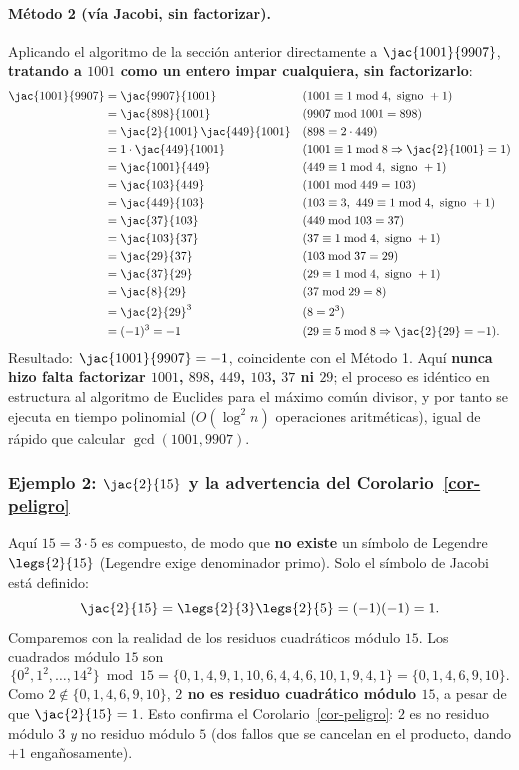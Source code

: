 \paragraph{Método 2 (vía Jacobi, sin factorizar).}
Aplicando el algoritmo de la sección anterior directamente a $\jac{1001}{9907}$, \textbf{tratando a $1001$ como un entero impar cualquiera, sin factorizarlo}:
\begin{align*}
\jac{1001}{9907} &= \jac{9907}{1001} & &(1001\equiv1\bmod4,\text{ signo }+1)\\
&= \jac{898}{1001} & &(9907 \bmod 1001 = 898)\\
&= \jac{2}{1001}\,\jac{449}{1001} & &(898=2\cdot449)\\
&= 1\cdot\jac{449}{1001} & &(1001\equiv1\bmod8 \Rightarrow \jac{2}{1001}=1)\\
&= \jac{1001}{449} & &(449\equiv1\bmod4,\text{ signo }+1)\\
&= \jac{103}{449} & &(1001 \bmod 449 = 103)\\
&= \jac{449}{103} & &(103\equiv3,\ 449\equiv1\bmod4,\text{ signo }+1)\\
&= \jac{37}{103} & &(449 \bmod 103 = 37)\\
&= \jac{103}{37} & &(37\equiv1\bmod4,\text{ signo }+1)\\
&= \jac{29}{37} & &(103 \bmod 37 = 29)\\
&= \jac{37}{29} & &(29\equiv1\bmod4,\text{ signo }+1)\\
&= \jac{8}{29} & &(37 \bmod 29 = 8)\\
&= \jac{2}{29}^3 & &(8=2^3)\\
&= (-1)^3=-1 & &(29\equiv5\bmod8 \Rightarrow \jac{2}{29}=-1).
\end{align*}
Resultado: $\jac{1001}{9907}=-1$, coincidente con el Método 1. Aquí \textbf{nunca hizo falta factorizar $1001$, $898$, $449$, $103$, $37$ ni $29$}; el proceso es idéntico en estructura al algoritmo de Euclides para el máximo común divisor, y por tanto se ejecuta en tiempo polinomial ($O(\log^2 n)$ operaciones aritméticas), igual de rápido que calcular $\gcd(1001,9907)$.

\subsubsection{Ejemplo 2: $\jac{2}{15}$ y la advertencia del Corolario~\ref{cor-peligro}}\label{ej:peligro}

Aquí $15=3\cdot5$ es compuesto, de modo que \textbf{no existe} un símbolo de Legendre $\legs{2}{15}$ (Legendre exige denominador primo). Solo el símbolo de Jacobi está definido:
\[
\jac{2}{15}=\legs{2}{3}\legs{2}{5}=(-1)(-1)=1.
\]
Comparemos con la realidad de los residuos cuadráticos módulo $15$. Los cuadrados módulo $15$ son
\[
\{0^2,1^2,\dots,14^2\}\bmod 15=\{0,1,4,9,1,10,6,4,4,6,10,1,9,4,1\}=\{0,1,4,6,9,10\}.
\]
Como $2\notin\{0,1,4,6,9,10\}$, \textbf{$2$ no es residuo cuadrático módulo $15$}, a pesar de que $\jac{2}{15}=1$. Esto confirma el Corolario~\ref{cor-peligro}: $2$ es no residuo módulo $3$ \emph{y} no residuo módulo $5$ (dos fallos que se cancelan en el producto, dando $+1$ engañosamente).

